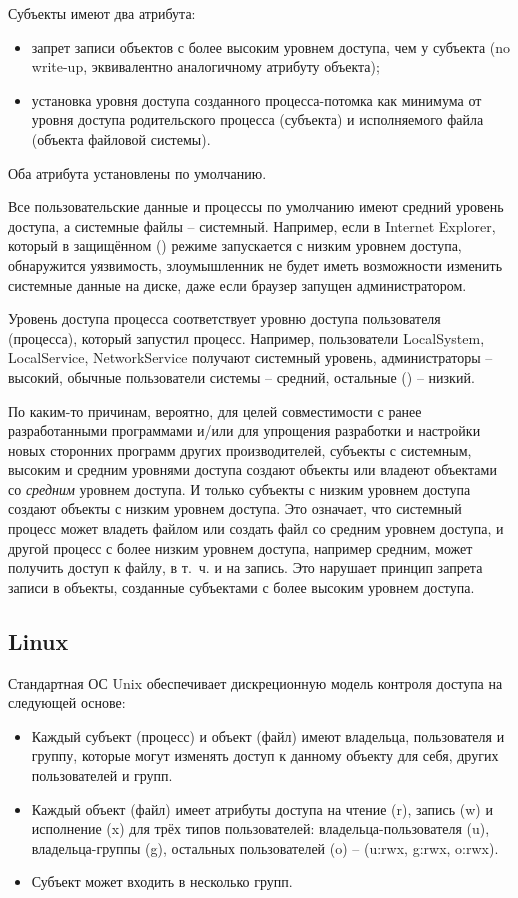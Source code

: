 Субъекты имеют два атрибута:
\begin{itemize}
    \item запрет записи объектов с более высоким уровнем доступа, чем у субъекта (no write-up, эквивалентно аналогичному атрибуту объекта);
    \item установка уровня доступа созданного процесса-потомка как минимума от уровня доступа родительского процесса (субъекта) и исполняемого файла (объекта файловой системы).
\end{itemize}
Оба атрибута установлены по умолчанию.

Все пользовательские данные и процессы по умолчанию имеют средний уровень доступа, а системные файлы -- системный. Например, если в Internet Explorer, который в защищённом () режиме запускается с низким уровнем доступа, обнаружится уязвимость, злоумышленник не будет иметь возможности изменить системные данные на диске, даже если браузер запущен администратором.

Уровень доступа процесса соответствует уровню доступа пользователя (процесса), который запустил процесс. Например, пользователи LocalSystem, LocalService, NetworkService получают системный уровень, администраторы -- высокий, обычные пользователи системы -- средний, остальные () -- низкий.

По каким-то причинам, вероятно, для целей совместимости с ранее разработанными программами и/или для упрощения разработки и настройки новых сторонних программ других производителей, субъекты с системным, высоким и средним уровнями доступа создают объекты или владеют объектами со \emph{средним} уровнем доступа. И только субъекты с низким уровнем доступа создают объекты с низким уровнем доступа. Это означает, что системный процесс может владеть файлом или создать файл со средним уровнем доступа, и другой процесс с более низким уровнем доступа, например средним, может получить доступ к файлу, в т.~ч. и на запись. Это нарушает принцип запрета записи в объекты, созданные субъектами с более высоким уровнем доступа.


\subsection{Linux}

Стандартная ОС Unix обеспечивает дискреционную модель контроля доступа на следующей основе:
\begin{itemize}
    \item Каждый субъект (процесс) и объект (файл) имеют владельца, пользователя и группу, которые могут изменять доступ к данному объекту для себя, других пользователей и групп.
    \item Каждый объект (файл) имеет атрибуты доступа на чтение (r), запись (w) и исполнение (x) для трёх типов пользователей: владельца-пользователя (u), владельца-группы (g), остальных пользователей (o) -- (u:rwx, g:rwx, o:rwx).
    \item Субъект может входить в несколько групп.
\end{itemize}

